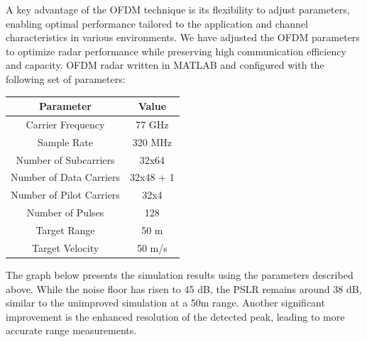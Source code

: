 \documentclass[conference]{IEEEtran}
\begin{document}
A key advantage of the OFDM technique is its flexibility to adjust parameters, enabling optimal performance tailored to the application and channel characteristics in various environments. We have adjusted the OFDM parameters to optimize radar performance while preserving high communication efficiency and capacity.
OFDM radar written in MATLAB and configured with the following set of parameters: 

\begin{center}
\begin{tabular}{|c|c|}
\hline
\textbf {Parameter} & \textbf {Value }\\
\hline
Carrier Frequency & 77 GHz \\
\hline
Sample Rate & 320 MHz \\
\hline
Number of Subcarriers & 32x64\\
\hline
Number of Data Carriers & 32x48 + 1 \\
\hline 
Number of Pilot Carriers & 32x4 \\
\hline 
Number of Pulses & 128 \\
\hline 
Target Range & 50 m \\
\hline 
Target Velocity & 50  m/s\\
\hline 
\end{tabular}
\end{center}


The graph below presents the simulation results using the parameters described above. While the noise floor has risen to 45 dB, the PSLR remains around 38 dB, similar to the unimproved simulation at a 50m range. Another significant improvement is the enhanced resolution of the detected peak, leading to more accurate range measurements.
\end{document}

